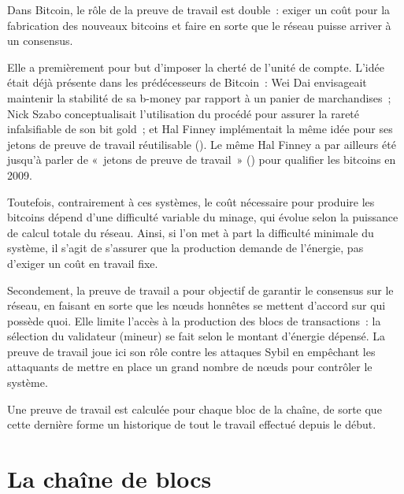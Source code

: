 Dans Bitcoin, le rôle de la preuve de travail est double~: exiger un coût pour la fabrication des nouveaux bitcoins et faire en sorte que le réseau puisse arriver à un consensus.

Elle a premièrement pour but d'imposer la cherté de l'unité de compte. L'idée était déjà présente dans les prédécesseurs de Bitcoin~: Wei Dai envisageait maintenir la stabilité de sa b-money par rapport à un panier de marchandises~; Nick Szabo conceptualisait l'utilisation du procédé pour assurer la rareté infalsifiable de son bit gold~; et Hal Finney implémentait la même idée pour ses jetons de preuve de travail réutilisable (). Le même Hal Finney a par ailleurs été jusqu'à parler de «~jetons de preuve de travail~» () pour qualifier les bitcoins en 2009.

Toutefois, contrairement à ces systèmes, le coût nécessaire pour produire les bitcoins dépend d'une difficulté variable du minage, qui évolue selon la puissance de calcul totale du réseau. Ainsi, si l'on met à part la difficulté minimale du système, il s'agit de s'assurer que la production demande de l'énergie, pas d'exiger un coût en travail fixe.

Secondement, la preuve de travail a pour objectif de garantir le consensus sur le réseau, en faisant en sorte que les nœuds honnêtes se mettent d'accord sur qui possède quoi. Elle limite l'accès à la production des blocs de transactions~: la sélection du validateur (mineur) se fait selon le montant d'énergie dépensé. La preuve de travail joue ici son rôle contre les attaques Sybil en empêchant les attaquants de mettre en place un grand nombre de nœuds pour contrôler le système.

Une preuve de travail est calculée pour chaque bloc de la chaîne, de sorte que cette dernière forme un historique de tout le travail effectué depuis le début.

\section*{La chaîne de blocs}

